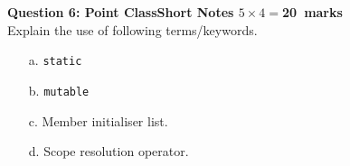 \documentclass[12pt,a4paper]{article}
\def\Qsix{20}
\begin{document}
\noindent\textbf{Question 6: Point ClassShort Notes \hfill $5\times 4=$\Qsix~marks}\\
Explain the use of following terms/keywords.
\begin{enumerate}
\item[a.] \verb|static|
\begin{figure}[H]
\end{figure}
\item[b.] \verb|mutable|
\begin{figure}[H]
\end{figure}
\item[c.] Member initialiser list.
\begin{figure}[H]
\end{figure}
\item[d.] Scope resolution operator.
\begin{figure}[H]
\end{figure}
\end{enumerate}
\end{document}
